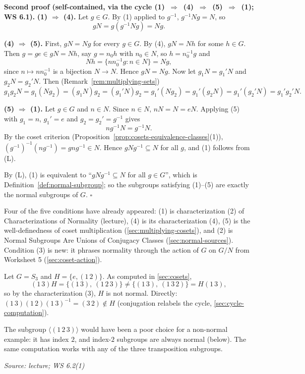 \documentclass[11pt]{report}
\renewenvironment{proof}[1][Proof]{\noindent\textbf{#1.} }{\hfill$\square$\par\vspace{5pt}}
\newcommand{\srcline}[1]{\par\hfill{\footnotesize\textit{Source: #1}}}
\begin{document}
\begin{proof}[Second proof (self-contained, via the cycle (1)~$\Rightarrow$~(4)~$\Rightarrow$~(5)~$\Rightarrow$~(1); WS 6.1)]
\textbf{(1) $\Rightarrow$ (4).} Let $g \in G$. By (1) applied to $g^{-1}$, $g^{-1}Ng = N$, so
\[ gN = g(g^{-1}Ng) = Ng. \]

\textbf{(4) $\Rightarrow$ (5).} First, $gN = Ng$ for every $g \in G$. By (4), $gN = Nh$ for some $h \in G$. Then $g = ge \in gN = Nh$, say $g = n_0h$ with $n_0 \in N$, so $h = n_0^{-1}g$ and
\[ Nh = \{nn_0^{-1}g : n \in N\} = Ng, \]
since $n \mapsto nn_0^{-1}$ is a bijection $N \to N$. Hence $gN = Ng$. Now let $g_1N = g_1'N$ and $g_2N = g_2'N$. Then (Remark~\ref{rem:multiplying-sets})
\[ g_1g_2N = g_1(Ng_2) = (g_1N)g_2 = (g_1'N)g_2 = g_1'(Ng_2) = g_1'(g_2N) = g_1'(g_2'N) = g_1'g_2'N. \]

\textbf{(5) $\Rightarrow$ (1).} Let $g \in G$ and $n \in N$. Since $n \in N$, $nN = N = eN$. Applying (5) with $g_1 = n$, $g_1' = e$ and $g_2 = g_2' = g^{-1}$ gives
\[ ng^{-1}N = g^{-1}N. \]
By the coset criterion (Proposition~\ref{prop:cosets-equivalence-classes}(1)), $(g^{-1})^{-1}(ng^{-1}) = gng^{-1} \in N$. Hence $gNg^{-1} \subseteq N$ for all $g$, and (1) follows from (L).

By (L), (1) is equivalent to ``$gNg^{-1} \subseteq N$ for all $g \in G$'', which is Definition~\ref{def:normal-subgroup}; so the subgroups satisfying (1)--(5) are exactly the normal subgroups of $G$.
\end{proof}

\begin{rembox}\label{rem:relation-lecture}
Four of the five conditions have already appeared: (1) is characterization (2) of Characterizations of Normality (lecture), (4) is its characterization (4), (5) is the well-definedness of coset multiplication (\ref{sec:multiplying-cosets}), and (2) is Normal Subgroups Are Unions of Conjugacy Classes (\ref{sec:normal-sources}). Condition (3) is new: it phrases normality through the action of $G$ on $G/N$ from Worksheet 5 (\ref{sec:coset-action}).
\end{rembox}

\begin{exbox}\label{ex:non-normal-subgroup-s3}
Let $G = S_3$ and $H = \{e, (1\,2)\}$. As computed in \ref{sec:cosets},
\[ (1\,3)H = \{(1\,3),\ (1\,2\,3)\} \neq \{(1\,3),\ (1\,3\,2)\} = H(1\,3), \]
so by the characterization (3), $H$ is not normal. Directly: $(1\,3)(1\,2)(1\,3)^{-1} = (3\,2) \notin H$ (conjugation relabels the cycle, \ref{sec:cycle-computation}).

The subgroup $\langle(1\,2\,3)\rangle$ would have been a poor choice for a non-normal example: it has index $2$, and index-$2$ subgroups are always normal (below). The same computation works with any of the three transposition subgroups.
\srcline{lecture; WS 6.2(1)}
\end{exbox}
\end{document}
